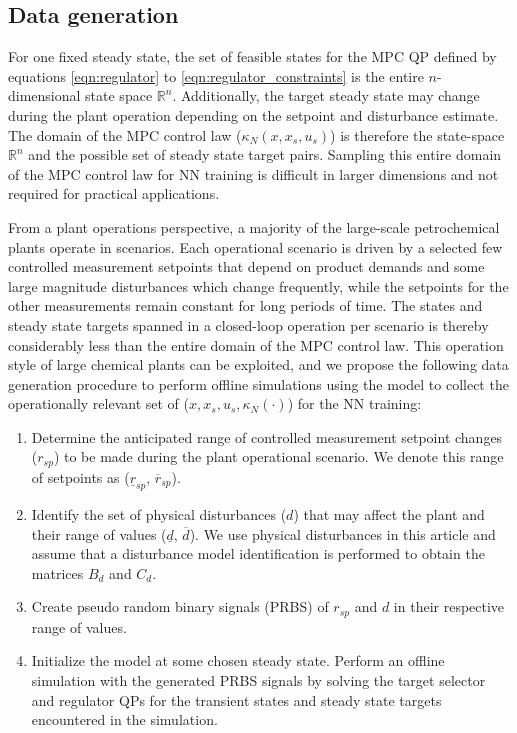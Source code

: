 \documentclass[preprint,5p, twocolumn, authoryear]{elsarticle}
\newcommand{\bbR}{\mathbb{R}}
\begin{document}
\subsection{Data generation}

For one fixed steady state, the 
set of feasible states for the MPC QP 
defined by equations \ref{eqn:regulator}
to \ref{eqn:regulator_constraints}
is the entire $n$-dimensional state space $\bbR^n$.
Additionally, the target steady state may change
during the plant operation depending
on the setpoint and disturbance estimate. 
The domain of the MPC control law ($\kappa_N(x, x_s, u_s)$)
is therefore the state-space 
$\bbR^{n}$ and the possible set of steady state 
target pairs.
Sampling this entire domain of the
MPC control law for NN training is difficult in larger 
dimensions and not required for practical applications. 

From a plant operations perspective,
a majority of the large-scale petrochemical plants
operate in scenarios. Each operational scenario is driven 
by a selected few controlled measurement 
setpoints that depend on product demands
and some large magnitude disturbances
which change frequently, 
while the setpoints for 
the other measurements remain constant for long periods 
of time. The states and steady state targets 
spanned in a closed-loop 
operation per scenario is thereby considerably less 
than the entire domain of the MPC control law.
This operation style of large chemical plants
can be exploited, and we propose the 
following data generation procedure 
to perform offline simulations using the model to 
collect the operationally 
relevant set of ($x, x_s, u_s, \kappa_N(\cdot)$) 
for the NN training:

\begin{enumerate}
    \item Determine the anticipated range of 
    controlled measurement setpoint changes ($r_{sp}$)
    to be made during the plant operational 
    scenario. We denote 
    this range of setpoints as ($\underline{r}_{sp}$, $\overline{r}_{sp}$).
    \item Identify the set of physical disturbances ($d$) 
    that may affect the plant and their range of values 
    ($\underline{d}$, $\overline{d}$). We use 
    physical disturbances in this article and assume that 
    a disturbance model identification is performed 
    to obtain the matrices $B_d$ and $C_d$.
    \item Create pseudo random binary signals (PRBS)
    of $r_{sp}$ and $d$ in their respective range of values.
    \item Initialize the model at some chosen steady state.
    Perform an offline simulation with the 
    generated PRBS signals by solving the target
    selector and regulator QPs for the transient states
    and steady state targets encountered in the simulation. 
\end{enumerate}
\end{document}
